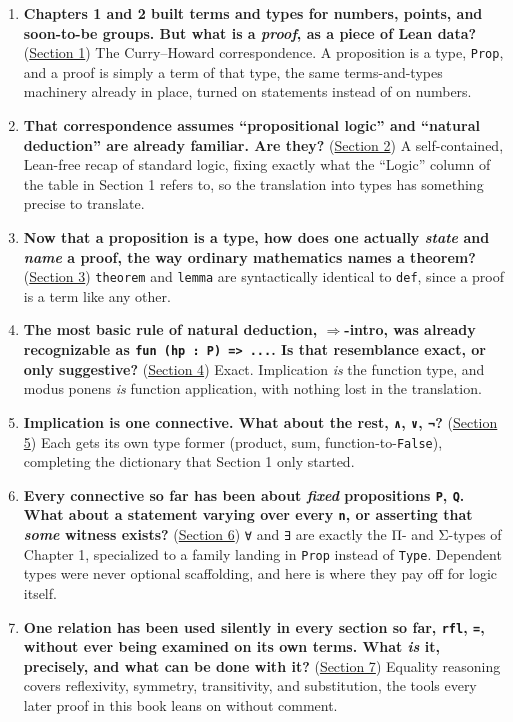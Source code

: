 \begin{enumerate}
\def\labelenumi{\arabic{enumi}.}
\tightlist
\item
  \textbf{Chapters 1 and 2 built terms and types for numbers, points, and soon-to-be groups. But what is a \emph{proof}, as a piece of Lean data?} (\hyperref[sec:03-propositions-and-proofs:01-prop:1]{Section 1}) The Curry--Howard correspondence. A proposition is a type, \texttt{Prop}, and a proof is simply a term of that type, the same terms-and-types machinery already in place, turned on statements instead of on numbers.
\item
  \textbf{That correspondence assumes ``propositional logic'' and ``natural deduction'' are already familiar. Are they?} (\hyperref[sec:03-propositions-and-proofs:02-logic-recap:1]{Section 2}) A self-contained, Lean-free recap of standard logic, fixing exactly what the ``Logic'' column of the table in Section 1 refers to, so the translation into types has something precise to translate.
\item
  \textbf{Now that a proposition is a type, how does one actually \emph{state} and \emph{name} a proof, the way ordinary mathematics names a theorem?} (\hyperref[sec:03-propositions-and-proofs:03-theorem-lemma:1]{Section 3}) \texttt{theorem} and \texttt{lemma} are syntactically identical to \texttt{def}, since a proof is a term like any other.
\item
  \textbf{The most basic rule of natural deduction, \(\Rightarrow\)-intro, was already recognizable as \texttt{fun (hp : P) => ...}. Is that resemblance exact, or only suggestive?} (\hyperref[sec:03-propositions-and-proofs:04-implication:1]{Section 4}) Exact. Implication \emph{is} the function type, and modus ponens \emph{is} function application, with nothing lost in the translation.
\item
  \textbf{Implication is one connective. What about the rest, \texttt{∧}, \texttt{∨}, \texttt{¬}?} (\hyperref[sec:03-propositions-and-proofs:05-and-or-not:1]{Section 5}) Each gets its own type former (product, sum, function-to-\texttt{False}), completing the dictionary that Section 1 only started.
\item
  \textbf{Every connective so far has been about \emph{fixed} propositions \texttt{P}, \texttt{Q}. What about a statement varying over every \texttt{n}, or asserting that \emph{some} witness exists?} (\hyperref[sec:03-propositions-and-proofs:06-quantifiers:1]{Section 6}) \texttt{∀} and \texttt{∃} are exactly the Π- and Σ-types of Chapter 1, specialized to a family landing in \texttt{Prop} instead of \texttt{Type}. Dependent types were never optional scaffolding, and here is where they pay off for logic itself.
\item
  \textbf{One relation has been used silently in every section so far, \texttt{rfl}, \texttt{=}, without ever being examined on its own terms. What \emph{is} it, precisely, and what can be done with it?} (\hyperref[sec:03-propositions-and-proofs:07-equality:1]{Section 7}) Equality reasoning covers reflexivity, symmetry, transitivity, and substitution, the tools every later proof in this book leans on without comment.
\end{enumerate}

